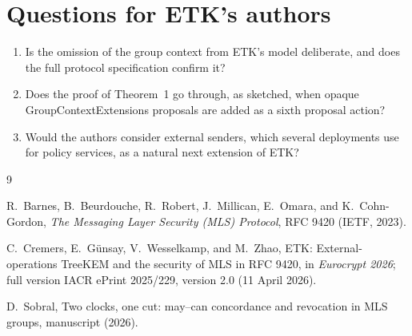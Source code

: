 \documentclass[aps,prx,reprint,superscriptaddress,nofootinbib,floatfix]{revtex4-2}
\theoremstyle{remark}
\begin{document}
\section{Questions for ETK's authors}

\begin{enumerate}
\item Is the omission of the group context from ETK's model deliberate, and does the full protocol specification confirm it?
\item Does the proof of Theorem~1 go through, as sketched, when opaque GroupContextExtensions proposals are added as a sixth proposal action?
\item Would the authors consider external senders, which several deployments use for policy services, as a natural next extension of ETK?
\end{enumerate}

\begin{thebibliography}{9}

 R.~Barnes, B.~Beurdouche, R.~Robert, J.~Millican, E.~Omara, and K.~Cohn-Gordon, \emph{The Messaging Layer Security (MLS) Protocol}, RFC 9420 (IETF, 2023).

 C.~Cremers, E.~G\"unsay, V.~Wesselkamp, and M.~Zhao, ETK: External-operations TreeKEM and the security of MLS in RFC 9420, in \emph{Eurocrypt 2026}; full version IACR ePrint 2025/229, version 2.0 (11 April 2026).

 D.~Sobral, Two clocks, one cut: may--can concordance and revocation in MLS groups, manuscript (2026).

\end{thebibliography}
\end{document}
